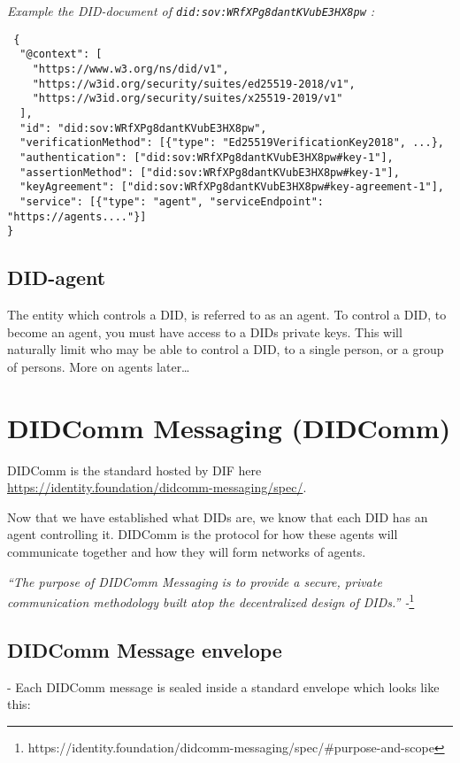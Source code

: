 \emph{Example the DID-document of \lstinline!did:sov:WRfXPg8dantKVubE3HX8pw! :}

\begin{lstlisting}
 {
  "@context": [
    "https://www.w3.org/ns/did/v1",
    "https://w3id.org/security/suites/ed25519-2018/v1",
    "https://w3id.org/security/suites/x25519-2019/v1"
  ],
  "id": "did:sov:WRfXPg8dantKVubE3HX8pw",
  "verificationMethod": [{"type": "Ed25519VerificationKey2018", ...},
  "authentication": ["did:sov:WRfXPg8dantKVubE3HX8pw#key-1"],
  "assertionMethod": ["did:sov:WRfXPg8dantKVubE3HX8pw#key-1"],
  "keyAgreement": ["did:sov:WRfXPg8dantKVubE3HX8pw#key-agreement-1"],
  "service": [{"type": "agent", "serviceEndpoint": "https://agents...."}]
}
\end{lstlisting}

\subsection{DID-agent}

The entity which controls a DID, is referred to as an agent. To control
a DID, to become an agent, you must have access to a DIDs private keys.
This will naturally limit who may be able to control a DID, to a single
person, or a group of persons. More on agents later\ldots{}




\hypertarget{didcomm-messaging-didcomm}{%
\section{DIDComm Messaging
(DIDComm)}\label{didcomm-messaging-didcomm}}

DIDComm is the standard hosted by DIF here \url{https://identity.foundation/didcomm-messaging/spec/}.

Now that we have established what DIDs are, we know that each DID has an
agent controlling it. DIDComm is the protocol for how these agents will
communicate together and how they will form networks of agents.

\emph{``The purpose of DIDComm Messaging is to provide a secure, private
communication methodology built atop the decentralized design of DIDs.''
-}\footnote{https://identity.foundation/didcomm-messaging/spec/\#purpose-and-scope}



\subsection{DIDComm Message envelope} - Each DIDComm message is sealed inside a standard envelope which looks
like this:

